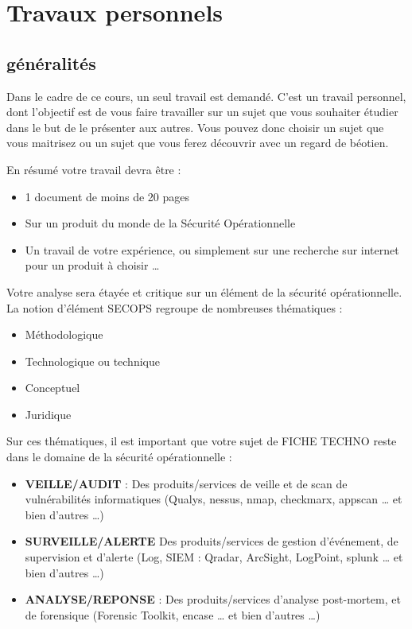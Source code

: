 
%


\section{Travaux personnels}

\subsection{généralités}
Dans le cadre de ce cours, un seul travail  est demandé. C'est un travail personnel, dont l'objectif est de vous faire travailler sur un sujet que vous souhaiter étudier dans le but de le présenter aux autres. Vous pouvez donc choisir un sujet que vous maitrisez ou un sujet que vous ferez découvrir avec un regard de béotien.

En résumé votre travail devra être : 

\begin{itemize}
  \item  1 document de moins de 20 pages
  \item  Sur un produit du monde de la Sécurité Opérationnelle
  \item  Un travail de votre expérience, ou simplement sur une recherche sur internet pour un produit à choisir …
\end{itemize}

Votre  analyse sera étayée et critique sur un élément de la sécurité opérationnelle. La notion d'élément SECOPS regroupe de nombreuses thématiques :

\begin{itemize}
  \item Méthodologique
  \item Technologique ou technique
  \item Conceptuel
  \item Juridique
\end{itemize}

Sur ces thématiques, il est important que votre sujet de FICHE TECHNO reste dans le domaine de la sécurité opérationnelle :
\begin{itemize}
  \item \textbf{VEILLE/AUDIT} : Des produits/services de veille et de scan de vulnérabilités informatiques (Qualys, nessus, nmap, checkmarx, appscan … et bien d’autres …) 
  \item \textbf{SURVEILLE/ALERTE} Des produits/services de gestion d’événement, de supervision et d’alerte (Log, SIEM : Qradar, ArcSight, LogPoint, splunk … et bien d’autres …)
  \item \textbf{ANALYSE/REPONSE} : Des produits/services d’analyse post-mortem, et de forensique (Forensic Toolkit, encase … et bien d’autres …)
\end{itemize}

